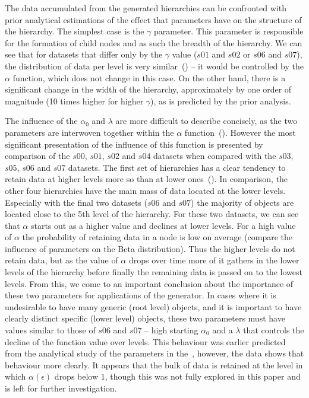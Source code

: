 \documentclass{article}
\begin{document}
	The data accumulated from the generated hierarchies can be confronted with prior analytical estimations of the effect that parameters have on the structure of the hierarchy. The simplest case is the $\gamma$ parameter. This parameter is responsible for the formation of child nodes and as such the breadth of the hierarchy. We can see that for datasets that differ only by the $\gamma$ value ($s01$ and $s02$ or $s06$ and $s07$), the distribution of data per level is very similar~() -- it would be controlled by the $\alpha$ function, which does not change in this case. On the other hand, there is a significant change in the width of the hierarchy, approximately by one order of magnitude (10 times higher for higher $\gamma$), as is predicted by the prior analysis.
	
	The influence of the $\alpha_0$ and $\lambda$ are more difficult to describe concisely, as the two parameters are interwoven together within the $\alpha$ function~(). However the most significant presentation of the influence of this function is presented by comparison of the $s00$, $s01$, $s02$ and $s04$ datasets when compared with the $s03$, $s05$, $s06$ and $s07$ datasets. The first set of hierarchies has a clear tendency to retain data at higher levels more so than at lower ones~(). In comparison, the other four hierarchies have the main mass of data located at the lower levels. Especially with the final two datasets ($s06$ and $s07$) the majority of objects are located close to the 5th level of the hierarchy. For these two datasets, we can see that $\alpha$ starts out as a higher value and declines at lower levels. For a high value of $\alpha$ the probability of retaining data in a node is low on average (compare the influence of parameters on the Beta distribution). Thus the higher levels do not retain data, but as the value of $\alpha$ drops over time more of it gathers in the lower levels of the hierarchy before finally the remaining data is passed on to the lowest levels. From this, we come to an important conclusion about the importance of these two parameters for applications of the generator. In cases where it is undesirable to have many generic (root level) objects, and it is important to have clearly distinct specific (lower level) objects, these two parameters must have values similar to those of $s06$ and $s07$ -- high starting $\alpha_0$ and a $\lambda$ that controls the decline of the function value over levels. This behaviour was earlier predicted from the analytical study of the parameters in the~, however, the data shows that behaviour more clearly. It appears that the bulk of data is retained at the level in which $\alpha(\epsilon)$ drops below $1$, though this was not fully explored in this paper and is left for further investigation.
	
\end{document}
